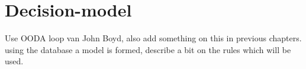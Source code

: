 \chapter{Decision-model}
Use OODA loop van John Boyd, also add something on this in previous chapters. \\
using the database a model is formed, describe a bit on the rules which will be used.